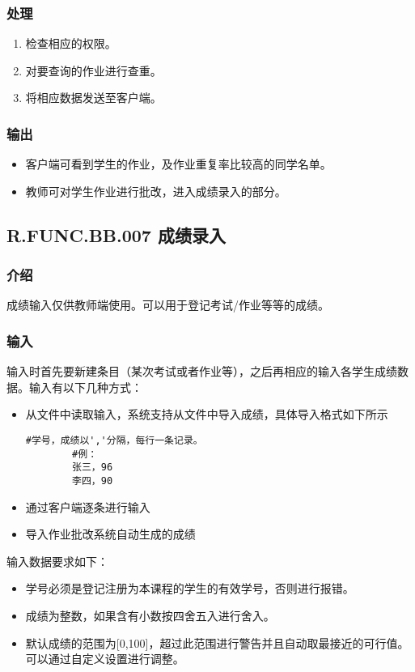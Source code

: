 	    \subsubsection{处理}
      \begin{enumerate}
        \item 检查相应的权限。
        \item 对要查询的作业进行查重。
        \item 将相应数据发送至客户端。
      \end{enumerate}
	    \subsubsection{输出}
      \begin{itemize}
        \item 客户端可看到学生的作业，及作业重复率比较高的同学名单。
        \item 教师可对学生作业进行批改，进入成绩录入的部分。
      \end{itemize}

    \subsection{R.FUNC.BB.007 成绩录入}
      \subsubsection{介绍}
      成绩输入仅供教师端使用。可以用于登记考试/作业等等的成绩。
      \subsubsection{输入}
      输入时首先要新建条目（某次考试或者作业等），之后再相应的输入各学生成绩数据。输入有以下几种方式：
      \begin{itemize}
        \item 从文件中读取输入，系统支持从文件中导入成绩，具体导入格式如下所示
        \begin{lstlisting}[caption=文件导入成绩示例, label={code:import_grade_from_file}]
        #学号，成绩以','分隔，每行一条记录。
        #例：
        张三，96
        李四，90
        \end{lstlisting}
        \item 通过客户端逐条进行输入
        \item 导入作业批改系统自动生成的成绩
      \end{itemize}
      输入数据要求如下：
      \begin{itemize}
        \item 学号必须是登记注册为本课程的学生的有效学号，否则进行报错。
        \item 成绩为整数，如果含有小数按四舍五入进行舍入。
        \item 默认成绩的范围为[0,100]，超过此范围进行警告并且自动取最接近的可行值。可以通过自定义设置进行调整。
      \end{itemize}
